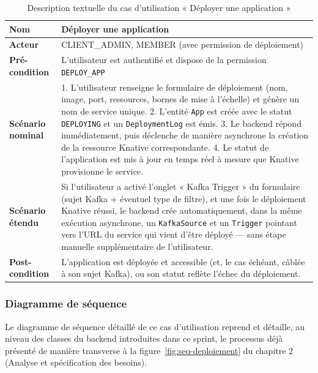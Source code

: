\begin{table}[!ht]
\begin{center}
     \begin{tabular}{|l{3.5cm}|p{9cm}|}
     \hline
     \textbf{Nom} & Déployer une application \\
     \hline
     \textbf{Acteur} & CLIENT\_ADMIN, MEMBER (avec permission de déploiement) \\
     \hline
     \textbf{Pré-condition} & L'utilisateur est authentifié et dispose de la permission \texttt{DEPLOY\_APP} \\
     \hline
     \textbf{Scénario nominal} & 1. L'utilisateur renseigne le formulaire de déploiement (nom, image, port, ressources, bornes de mise à l'échelle) et génère un nom de service unique. 2. L'entité \texttt{App} est créée avec le statut \texttt{DEPLOYING} et un \texttt{DeploymentLog} est émis. 3. Le backend répond immédiatement, puis déclenche de manière asynchrone la création de la ressource Knative correspondante. 4. Le statut de l'application est mis à jour en temps réel à mesure que Knative provisionne le service. \\
     \hline
     \textbf{Scénario étendu} & Si l'utilisateur a activé l'onglet « Kafka Trigger » du formulaire (sujet Kafka + éventuel type de filtre), et une fois le déploiement Knative réussi, le backend crée automatiquement, dans la même exécution asynchrone, un \texttt{KafkaSource} et un \texttt{Trigger} pointant vers l'URL du service qui vient d'être déployé — sans étape manuelle supplémentaire de l'utilisateur. \\
     \hline
     \textbf{Post-condition} & L'application est déployée et accessible (et, le cas échéant, câblée à son sujet Kafka), ou son statut reflète l'échec du déploiement. \\
     \hline
     \end{tabular}
     \caption{Description textuelle du cas d'utilisation « Déployer une application »}
     \label{tab:uc-deploy}
     \end{center}
\end{table}

\subsubsection{Diagramme de séquence}

Le diagramme de séquence détaillé de ce cas d'utilisation reprend et détaille, au niveau des classes du backend introduites dans ce sprint, le processus déjà présenté de manière transverse à la figure~\ref{fig:seq-deploiement} du chapitre 2 (Analyse et spécification des besoins).


